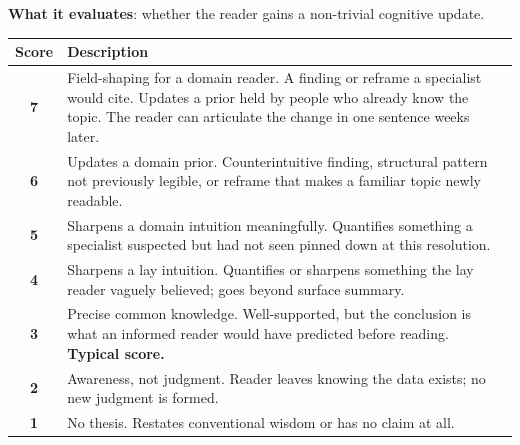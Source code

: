 \begin{tcolorbox}[promptbox, title={Rubric Evaluation scoring guideline}]
\textbf{What it evaluates}: whether the reader gains a non-trivial cognitive
update.
\begin{center}
\small
\begin{tabularx}{\linewidth}{cX}
\toprule
Score & Description \\
\midrule
\textbf{7} & Field-shaping for a domain reader. A finding or reframe a specialist would cite. Updates a prior held by people who already know the topic. The reader can articulate the change in one sentence weeks later. \\
\textbf{6} & Updates a domain prior. Counterintuitive finding, structural pattern not previously legible, or reframe that makes a familiar topic newly readable. \\
\textbf{5} & Sharpens a domain intuition meaningfully. Quantifies something a specialist suspected but had not seen pinned down at this resolution. \\
\textbf{4} & Sharpens a lay intuition. Quantifies or sharpens something the lay reader vaguely believed; goes beyond surface summary. \\
\textbf{3} & Precise common knowledge. Well-supported, but the conclusion is what an informed reader would have predicted before reading. \textbf{Typical score.} \\
\textbf{2} & Awareness, not judgment. Reader leaves knowing the data exists; no new judgment is formed. \\
\textbf{1} & No thesis. Restates conventional wisdom or has no claim at all. \\
\bottomrule
\end{tabularx}
\end{center}

\end{tcolorbox}